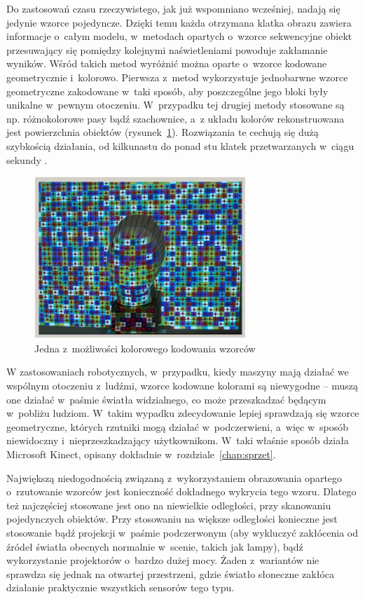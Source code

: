 Do zastosowań czasu rzeczywistego, jak już wspomniano wcześniej, nadają się
jedynie wzorce pojedyncze. Dzięki temu każda otrzymana klatka obrazu zawiera
informacje o~całym modelu, w~metodach opartych o~wzorce sekwencyjne obiekt
przesuwający się pomiędzy kolejnymi naświetleniami powoduje zakłamanie wyników.
Wśród takich metod wyróżnić można oparte o~wzorce kodowane geometrycznie
i~kolorowo. Pierwsza z~metod wykorzystuje jednobarwne wzorce geometryczne
zakodowane w~taki sposób, aby poszczególne jego bloki były unikalne w~pewnym
otoczeniu. W~przypadku tej drugiej metody stosowane są np. różnokolorowe pasy
bądź szachownice, a~z układu kolorów rekonstruowana jest powierzchnia obiektów (rysunek~\ref{fig:struct_color}).
Rozwiązania te cechują się dużą szybkością działania, od kilkunastu do ponad
stu klatek przetwarzanych w~ciągu sekundy \cite{4429304}.

\begin{figure}[h!]
\centering
\includegraphics[width=8cm]{../../Common/img/struct_color}
\caption[Wzorzec kodowany kolorem]
{Jedna z~możliwości kolorowego kodowania wzorców \cite{4429304}}
\label{fig:struct_color}
\end{figure}

W zastosowaniach robotycznych, w~przypadku, kiedy maszyny mają działać we
wspólnym otoczeniu z~ludźmi, wzorce kodowane kolorami są niewygodne -- muszą one
działać w~paśmie światła widzialnego, co może przeszkadzać będącym w~pobliżu
ludziom. W~takim wypadku zdecydowanie lepiej sprawdzają się wzorce
geometryczne, których rzutniki mogą działać w~podczerwieni, a~więc w~sposób
niewidoczny i~nieprzeszkadzający użytkownikom. W~taki właśnie sposób działa
Microsoft Kinect, opisany dokładnie w~rozdziale~\ref{chap:sprzet}.

Największą niedogodnością związaną z~wykorzystaniem obrazowania opartego
o~rzutowanie wzorców jest konieczność dokładnego wykrycia tego wzoru. Dlatego też
najczęściej stosowane jest ono na niewielkie odległości, przy skanowaniu
pojedynczych obiektów. Przy stosowaniu na większe odległości konieczne jest
stosowanie bądź projekcji w~paśmie podczerwonym (aby wykluczyć zakłócenia od
źródeł światła obecnych normalnie w~scenie, takich jak lampy), bądź wykorzystanie projektorów o~bardzo dużej
mocy. Żaden z~wariantów nie sprawdza się jednak na otwartej przestrzeni, gdzie
światło słoneczne zakłóca działanie praktycznie wszystkich sensorów tego typu.


